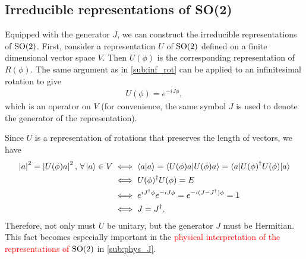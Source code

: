     \subsection{Irreducible representations of SO(2)}\label{sub:irr_so2}
    Equipped with the generator $J$, we can construct the irreducible representations of $\textrm{SO}{(2)}$.
    First, consider a representation $U$ of $\textrm{SO}{(2)}$ defined on a finite dimensional vector space $V$. Then $U(\phi)$ is the corresponding representation of $R(\phi)$. The same argument as in \cref{sub:inf_rot} can be applied to an infinitesimal rotation to give
    \begin{align*}
        U(\phi) = e^{-iJ\phi},
    \end{align*}
    which is an operator on $V$ (for convenience, the same symbol $J$ is used to denote the generator of the representation).

    Since $U$ is a representation of rotations that preserves the length of vectors, we have
    \begin{align*}
        \left|a\right|^2 = \left|U(\phi)a\right|^2, \, \forall \ket{a}\in V &\iff \braket{a|a} = \braket{U(\phi)a|U(\phi)a} = \braket{a|{U(\phi)}^\dagger U(\phi)|a} \\
        &\iff U(\phi)^\dagger U(\phi) = E \\
        &\iff e^{iJ^\dagger\phi}e^{-iJ\phi} = e^{-i(J-J^\dagger)\phi} = 1 \\
        &\iff J = J^\dagger.
    \end{align*}
    Therefore, not only must $U$ be unitary, but the generator $J$ must be Hermitian. This fact becomes especially important in the \textcolor{red}{physical interpretation of the representations of $\textrm{SO}{(2)}$} in \cref{sub:phys_J}.

